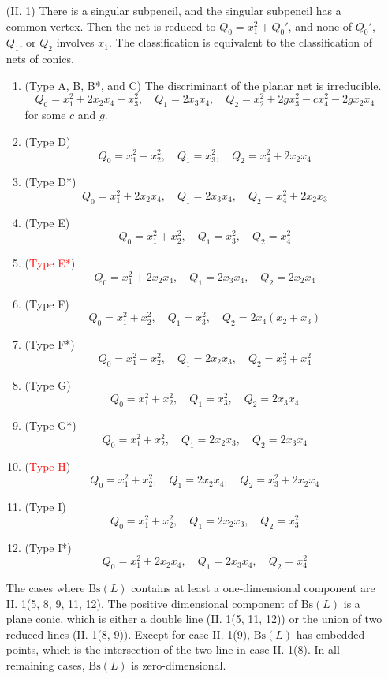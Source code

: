 \documentclass{amsart}[12pt]
\theoremstyle{definition}
\theoremstyle{remark}
\numberwithin{equation}{section}
\begin{document}
\begin{itemize}
\item[(II. 1)] There is a singular subpencil, and the singular subpencil has a common vertex. Then the net is reduced to $Q_0 = x_1^2 + Q_0'$, and none of $Q_0'$, $Q_1$, or $Q_2$ involves $x_1$. The classification is equivalent to the classification of nets of conics. 
\begin{enumerate}
\item (Type A, B, B*, and C) The discriminant of the planar net is irreducible.
\[
Q_0 = x_1^2 + 2x_2x_4 + x_3^2, \quad Q_1 = 2x_3x_4, \quad Q_2 = x_2^2 + 2gx_3^2 - cx_4^2 - 2gx_2x_4
\]
for some $c$ and $g$.
\item (Type D)
\[
Q_0 = x_1^2 + x_2^2, \quad Q_1 = x_3^2, \quad Q_2 = x_4^2 + 2x_2x_4
\]
\item (Type D*)
\[
Q_0 = x_1^2 + 2x_2x_4, \quad Q_1 = 2x_3x_4, \quad Q_2 = x_4^2 + 2x_2x_3
\]
\item (Type E)
\[
Q_0 = x_1^2 + x_2^2, \quad Q_1 = x_3^2, \quad Q_2 = x_4^2
\]
\item (\textcolor{red}{Type E*})
\[
Q_0 = x_1^2 + 2x_2x_4, \quad Q_1 = 2x_3x_4, \quad Q_2 = 2x_2x_4
\]
\item (Type F)
\[
Q_0 = x_1^2 + x_2^2, \quad Q_1 = x_3^2, \quad Q_2 = 2x_4(x_2 + x_3)
\]
\item (Type F*)
\[
Q_0 = x_1^2 + x_2^2, \quad Q_1 = 2x_2x_3, \quad Q_2 = x_3^2 + x_4^2
\]
\item (Type G)
\[
Q_0 = x_1^2 + x_2^2, \quad Q_1 = x_3^2, \quad Q_2 = 2x_3x_4
\]
\item (Type G*)
\[
Q_0 = x_1^2 + x_2^2, \quad Q_1 = 2x_2x_3, \quad Q_2 = 2x_3x_4
\]
\item (\textcolor{red}{Type H})
\[
Q_0 = x_1^2 + x_2^2, \quad Q_1 = 2x_2x_4, \quad Q_2 = x_3^2 + 2x_2x_4
\]
\item (Type I)
\[
Q_0 = x_1^2 + x_2^2, \quad Q_1 = 2x_2x_3, \quad Q_2 = x_3^2
\]
\item (Type I*)  
\[
Q_0 = x_1^2 + 2x_2x_4, \quad Q_1 = 2x_3x_4, \quad Q_2 = x_4^2
\]       
\end{enumerate}
The cases where $\mathrm{Bs}(L)$ contains at least a one-dimensional component are II. 1(5, 8, 9, 11, 12). The positive dimensional component of $\mathrm{Bs}(L)$ is a plane conic, which is either a double line (II. 1(5, 11, 12)) or the union of two reduced lines (II. 1(8, 9)). Except for case II. 1(9), $\mathrm{Bs}(L)$ has embedded points, which is the intersection of the two line in case II. 1(8). In all remaining cases, $\mathrm{Bs}(L)$ is zero-dimensional.


\end{itemize}
\end{document}
